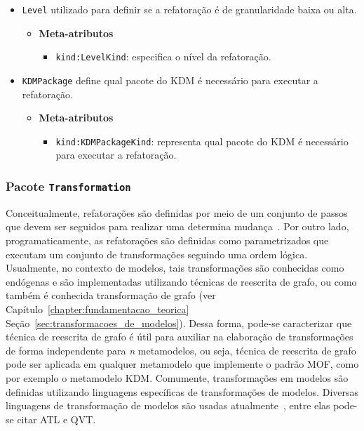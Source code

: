 \begin{itemize}
\item \texttt{Level} utilizado para definir se a refatoração é de granularidade baixa ou alta.

\begin{itemize}
	\item \textbf{Meta-atributos}
		\begin{itemize}
			\item \texttt{kind:LevelKind}: especifica o nível da refatoração.
		\end{itemize}	
\end{itemize} 

\item \texttt{KDMPackage} define qual pacote do KDM é necessário para executar a refatoração.

\begin{itemize}
	\item \textbf{Meta-atributos}
		\begin{itemize}
			\item \texttt{kind:KDMPackageKind}: representa qual pacote do KDM é necessário para executar a refatoração.
		\end{itemize}	
\end{itemize} 

\end{itemize}

\subsubsection{Pacote \texttt{Transformation}}

Conceitualmente, refatorações são definidas por meio de um conjunto de passos que devem ser seguidos para realizar uma determina mudança~\cite{Fowler1999, Demeyer1}. Por outro lado, programaticamente, as refatorações são definidas como  parametrizados que executam um conjunto de transformações seguindo uma ordem lógica. Usualmente, no contexto de modelos, tais transformações são conhecidas como endógenas e são implementadas utilizando técnicas de reescrita de grafo, ou como também é conhecida transformação de grafo (ver Capítulo~\ref{chapter:fundamentacao_teorica} Seção~\ref{sec:transformacoes_de_modelos}). Dessa forma, pode-se caracterizar que técnica de reescrita de grafo é útil para auxiliar na elaboração de transformações de forma independente para \textit{n} metamodelos, ou seja, técnica de reescrita de grafo pode ser aplicada em qualquer metamodelo que implemente o padrão MOF, como por exemplo o metamodelo KDM. Comumente, transformações em modelos são definidas utilizando linguagens específicas de transformações de modelos. Diversas linguagens de transformação de modelos são usadas atualmente~\cite{Biehl_2010, Allilaire_06}, entre elas pode-se citar ATL e QVT.

